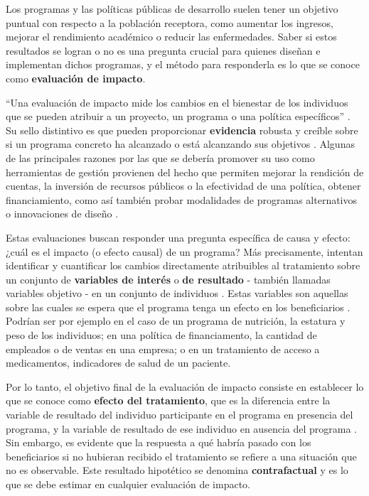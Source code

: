 \documentclass[../../main.tex]{subfiles}
\begin{document}
Los programas y las políticas públicas de desarrollo suelen tener un objetivo puntual con
respecto a la población receptora, como aumentar los ingresos, mejorar el rendimiento
académico o reducir las enfermedades\cite{gertler-2016}. Saber si estos resultados se
logran o no es una pregunta crucial para quienes diseñan e implementan dichos programas, y
el método para responderla es lo que se conoce como \textbf{evaluación de impacto}.

``Una evaluación de impacto mide los cambios en el bienestar de los individuos que se pueden
atribuir a un proyecto, un programa o una política específicos'' \cite{gertler-2016}. Su
sello distintivo es que pueden proporcionar \textbf{evidencia} robusta y creíble sobre si
un programa concreto ha alcanzado o está alcanzando sus objetivos \cite{gertler-2016}.
Algunas de las principales razones por las que se debería promover su uso como
herramientas de gestión provienen del hecho que permiten mejorar la rendición de cuentas,
la inversión de recursos públicos o la efectividad de una política, obtener
financiamiento, como así también probar modalidades de programas alternativos o
innovaciones de diseño \cite{gertler-2016}.

Estas evaluaciones buscan responder una pregunta específica de causa y efecto: ¿cuál es el
impacto (o efecto causal) de un programa? Más precisamente, intentan identificar y
cuantificar los cambios directamente atribuibles al tratamiento \cite{gertler-2016} sobre
un conjunto de \textbf{variables de interés} o \textbf{de resultado} - también llamadas
variables objetivo - en un conjunto de individuos \cite{bernal}. Estas variables son
aquellas sobre las cuales se espera que el programa tenga un efecto en los beneficiarios
\cite{bernal}. Podrían ser por ejemplo en el caso de un programa de nutrición, la estatura
y peso de los individuos; en una política de financiamento, la cantidad de empleados o de
ventas en una empresa; o en un tratamiento de acceso a medicamentos, indicadores de salud
de un paciente.

Por lo tanto, el objetivo final de la evaluación de impacto consiste en establecer lo que
se conoce como \textbf{efecto del tratamiento}, que es la diferencia entre la variable de
resultado del individuo participante en el programa en presencia del programa, y la
variable de resultado de ese individuo en ausencia del programa \cite{bernal}. Sin
embargo, es evidente que la respuesta a qué habría pasado con los beneficiarios si no
hubieran recibido el tratamiento se refiere a una situación que no es observable. Este
resultado hipotético se denomina \textbf{contrafactual} y es lo que se debe estimar en
cualquier evaluación de impacto.
\end{document}
